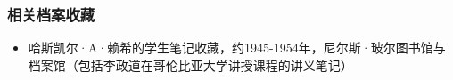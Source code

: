 \subsubsection{相关档案收藏} 
\begin{itemize}
\item 哈斯凯尔·A·赖希的学生笔记收藏，约1945-1954年，尼尔斯·玻尔图书馆与档案馆（包括李政道在哥伦比亚大学讲授课程的讲义笔记）
\end{itemize}
